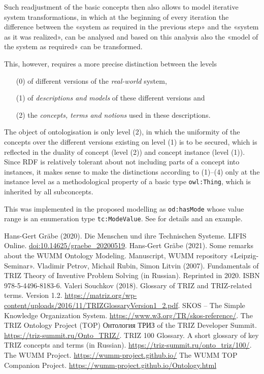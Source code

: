 \documentclass[11pt,a4paper]{article}
\begin{document}
Such readjustment of the basic concepts then also allows to model iterative
system transformations, in which at the beginning of every iteration the
difference between the «system as required in the previous step» and the
«system as it was realized», can be analysed and based on this analysis also
the «model of the system as required» can be transformed.

This, however, requires a more precise distinction between the levels 
\begin{itemize}[noitemsep]
\item [(0)] of different versions of the \emph{real-world} system,
\item [(1)] of \emph{descriptions and models} of these different versions and
\item [(2)] the \emph{concepts, terms and notions} used in these descriptions.
\end{itemize}
The object of ontologisation is only level (2), in which the uniformity of the
concepts over the different versions existing on level (1) is to be secured,
which is reflected in the duality of concept (level (2)) and concept instance
(level (1)).  Since RDF is relatively tolerant about not including parts of a
concept into instances, it makes sense to make the distinctions according to
(1)--(4) only at the instance level as a methodological property of a basic
type \texttt{owl:Thing}, which is inherited by all subconcepts.  

This was implemented in the proposed modelling as \texttt{od:hasMode}
whose value range is an enumeration type \texttt{tc:ModeValue}.  See
\cite{Graebe2021} for details and an example.


\begin{thebibliography}{xxx}
\raggedright
{} Hans-Gert Gräbe (2020).  Die Menschen und ihre
  Technischen Systeme. LIFIS Online.  \url{doi:10.14625/graebe_20200519}.
 Hans-Gert Gräbe (2021).  Some remarks about the WUMM
  Ontology Modeling.  Manuscript, WUMM repository «Leipzig-Seminar». 
 Vladimir Petrov, Michail Rubin, Simon Litvin (2007).
  Fundamentals of TRIZ Theory of Inventive Problem Solving (in Russian).
  Reprinted in 2020. ISBN 978-5-4496-8183-6.
 Valeri Souchkov (2018).  Glossary of TRIZ and
  TRIZ-related terms. Version 1.2.
  \url{https://matriz.org/wp-content/uploads/2016/11/TRIZGlossaryVersion1_2.pdf}. 
 SKOS -- The Simple Knowledge Organization System.
  \url{https://www.w3.org/TR/skos-reference/}.  
 The TRIZ Ontology Project (TOP)
  \foreignlanguage{russian}{Онтология ТРИЗ} of the TRIZ Developer Summit.
  \url{https://triz-summit.ru/Onto_TRIZ/}.
 TRIZ 100 Glossary. A short glossary of key TRIZ
  concepts and terms (in Russian).
  \url{https://triz-summit.ru/onto_triz/100/}.
 The WUMM Project. \url{https://wumm-project.github.io/} 
 The WUMM TOP Companion Project.
  \url{https://wumm-project.github.io/Ontology.html} 
\end{thebibliography}
\end{document}
